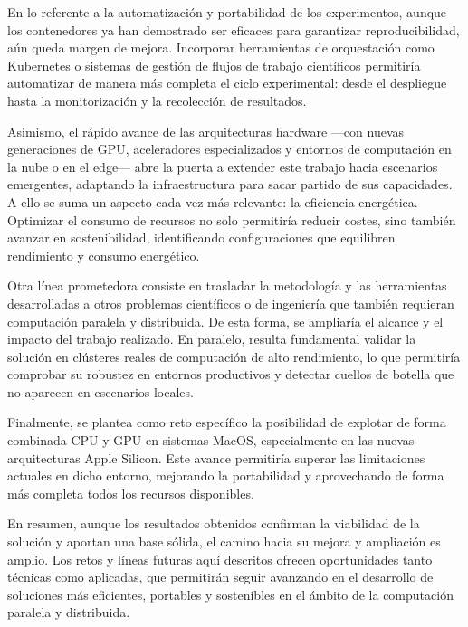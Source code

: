 En lo referente a la automatización y portabilidad de los experimentos, aunque los contenedores ya han demostrado ser eficaces para garantizar reproducibilidad, aún queda margen de mejora. Incorporar herramientas de orquestación como Kubernetes o sistemas de gestión de flujos de trabajo científicos permitiría automatizar de manera más completa el ciclo experimental: desde el despliegue hasta la monitorización y la recolección de resultados.

Asimismo, el rápido avance de las arquitecturas hardware —con nuevas generaciones de GPU, aceleradores especializados y entornos de computación en la nube o en el edge— abre la puerta a extender este trabajo hacia escenarios emergentes, adaptando la infraestructura para sacar partido de sus capacidades. A ello se suma un aspecto cada vez más relevante: la eficiencia energética. Optimizar el consumo de recursos no solo permitiría reducir costes, sino también avanzar en sostenibilidad, identificando configuraciones que equilibren rendimiento y consumo energético.

Otra línea prometedora consiste en trasladar la metodología y las herramientas desarrolladas a otros problemas científicos o de ingeniería que también requieran computación paralela y distribuida. De esta forma, se ampliaría el alcance y el impacto del trabajo realizado. En paralelo, resulta fundamental validar la solución en clústeres reales de computación de alto rendimiento, lo que permitiría comprobar su robustez en entornos productivos y detectar cuellos de botella que no aparecen en escenarios locales.

Finalmente, se plantea como reto específico la posibilidad de explotar de forma combinada CPU y GPU en sistemas MacOS, especialmente en las nuevas arquitecturas Apple Silicon. Este avance permitiría superar las limitaciones actuales en dicho entorno, mejorando la portabilidad y aprovechando de forma más completa todos los recursos disponibles.

En resumen, aunque los resultados obtenidos confirman la viabilidad de la solución y aportan una base sólida, el camino hacia su mejora y ampliación es amplio. Los retos y líneas futuras aquí descritos ofrecen oportunidades tanto técnicas como aplicadas, que permitirán seguir avanzando en el desarrollo de soluciones más eficientes, portables y sostenibles en el ámbito de la computación paralela y distribuida.
